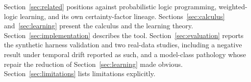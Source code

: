 Section~\ref{sec:related} positions \pla{} against probabilistic logic
programming, weighted-logic learning, and its own certainty-factor
lineage. Sections~\ref{sec:calculus} and~\ref{sec:learning} present the
calculus and the learning theory. Section~\ref{sec:implementation}
describes the tool. Section~\ref{sec:evaluation} reports the synthetic
harness validation and two real-data studies, including a negative
result under temporal drift reported as such, and a model-class pathology whose
repair the reduction of Section~\ref{sec:learning} made obvious.
Section~\ref{sec:limitations} lists limitations explicitly.
